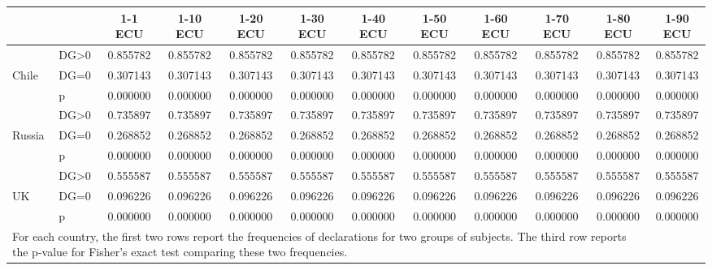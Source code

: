 \def\sym#1{\ifmmode^{#1}\else\(^{#1}\)\fi}
\begin{tabular}{|ll|cccccccccc|}
\hline\hline
&&1-1 ECU&1-10 ECU&1-20 ECU&1-30 ECU&1-40 ECU&1-50 ECU&1-60 ECU&1-70 ECU&1-80 ECU&1-90 ECU\\
\hline
&DG>0& 0.855782& 0.855782& 0.855782& 0.855782& 0.855782& 0.855782& 0.855782& 0.855782& 0.855782& 0.855782\\
Chile&DG=0& 0.307143& 0.307143& 0.307143& 0.307143& 0.307143& 0.307143& 0.307143& 0.307143& 0.307143& 0.307143\\
&p& 0.000000& 0.000000& 0.000000& 0.000000& 0.000000& 0.000000& 0.000000& 0.000000& 0.000000& 0.000000\\
\hline&DG>0& 0.735897& 0.735897& 0.735897& 0.735897& 0.735897& 0.735897& 0.735897& 0.735897& 0.735897& 0.735897\\
Russia&DG=0& 0.268852& 0.268852& 0.268852& 0.268852& 0.268852& 0.268852& 0.268852& 0.268852& 0.268852& 0.268852\\
&p& 0.000000& 0.000000& 0.000000& 0.000000& 0.000000& 0.000000& 0.000000& 0.000000& 0.000000& 0.000000\\
\hline&DG>0& 0.555587& 0.555587& 0.555587& 0.555587& 0.555587& 0.555587& 0.555587& 0.555587& 0.555587& 0.555587\\
UK&DG=0& 0.096226& 0.096226& 0.096226& 0.096226& 0.096226& 0.096226& 0.096226& 0.096226& 0.096226& 0.096226\\
&p& 0.000000& 0.000000& 0.000000& 0.000000& 0.000000& 0.000000& 0.000000& 0.000000& 0.000000& 0.000000\\
\hline\multicolumn{11}{p{15cm}}{\tiny For each country, the first two rows report the frequencies of declarations for two groups of subjects. The third row reports the p-value for Fisher's exact test comparing these two frequencies.}\\
\end{tabular}